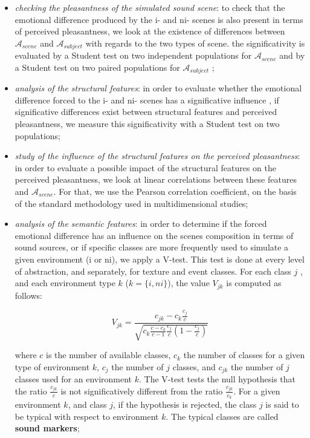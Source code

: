 \documentclass[twoside,twocolumn]{article}
\begin{document}
\begin{itemize}
\item \emph{checking the pleasantness of the simulated sound scene}: to check that the emotional difference produced by the i- and ni- scenes is also present in terms of perceived pleasantness, we look at the existence of differences between $\mathcal{A}_{scene}$ and $\mathcal{A}_{subject}$ with regards to the two types of scene. the significativity is evaluated by a Student test on two independent populations for $\mathcal{A}_{scene}$ and by a Student test on two paired populations for $\mathcal{A}_{subject}$ ;
\item \emph{analysis of the structural features}: in order to evaluate whether the emotional difference forced to the i- and ni- scenes has a significative influence \ie, if significative differences exist between structural features and perceived pleasantness, we measure this significativity with a Student test on two populations;
\item \emph{study of the influence of the structural features on the perceived pleasantness}: in order to evaluate a possible impact of the structural features on the perceived pleasantness, we look at linear correlations between these features and $\mathcal{A}_{scene}$. For that, we use the Pearson correlation coefficient, on the basis of the standard methodology used in multidimensional studies;
\item \emph{analysis of the semantic features}: in order to determine if the forced emotional difference has an influence on the scenes composition in terms of sound sources, or if specific  classes are more frequently used to simulate a given environment (i or ni), we apply a V-test. This test is done at every level of abstraction, and separately, for texture and event classes. For each class $j$ , and each environment type $k$ ($k=\lbrace i,ni\rbrace$), the value $V_{jk}$ is computed as follows:

\begin{equation*}
V_{jk}=\dfrac{c_{jk}-c_k\frac{c_j}{c}}{\sqrt{c_k\frac{c-c_k}{c-1}\frac{c_j}{c}(1-\frac{c_j}{c})}}
\end{equation*}

where $c$ is the number of available classes, $c_k$ the number of classes for a given type of environment $k$, $c_j$ the number of  $j$ classes, and $c_{jk}$ the number of $j$ classes used for an environment $k$. The V-test tests the null hypothesis that the ratio $\frac{c_{jk}}{c}$ is not significatively different from the ratio $\frac{c_{jk}}{c_k}$. For a given environment $k$, and class $j$, if the hypothesis is rejected, the class $j$ is said to be typical with respect to environment $k$. The typical classes are called \textbf{sound markers};


\end{itemize}
\end{document}
